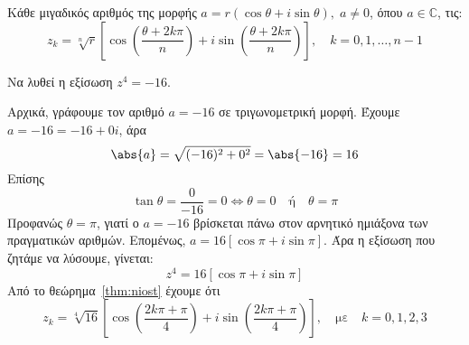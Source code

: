       \begin{thm}\label{thm:niost}
        Κάθε μιγαδικός αριθμός της μορφής $a=r(\cos\theta+i\sin\theta), \; a\neq 0$,
        όπου $ a \in \mathbb{C} $, τις: 
        \[
          \boxed{z_{k}=\sqrt[n]{r}\left[ \cos\left(\frac{\theta+2k\pi}{n}\right)+i
          \sin\left(\frac{\theta+2k\pi}{n}\right) \right], \quad k=0,1,\ldots, n-1}
        \]
      \end{thm}
      \begin{example}
        Να λυθεί η εξίσωση $ z^{4} = -16 $. 
      \end{example}
      \begin{solution}
        Αρχικά, γράφουμε τον αριθμό $ a = -16 $ σε τριγωνομετρική μορφή. Έχουμε 
        $ a=-16=-16+0i $, άρα 
        \[ 
          \abs{a} = \sqrt{(-16)^{2}+0^2} = \abs{-16} = 16 
        \] 
        Επίσης
        \[
          \tan{\theta} = \frac{0}{-16} = 0 \Leftrightarrow \theta =0 \quad
          \text{ή} \quad \theta = \pi
        \] 
        Προφανώς $ \theta = \pi $, γιατί ο $a=-16$ βρίσκεται πάνω στον αρνητικό 
        ημιάξονα των πραγματικών αριθμών. Επομένως, $ a = 16[\cos{\pi} + i
        \sin{\pi}] $. Άρα η εξίσωση που ζητάμε να λύσουμε, γίνεται:
        \[
          z^{4} = 16 [\cos{\pi} + i \sin{\pi}] 
        \] 
        Από το θεώρημα~\ref{thm:niost} έχουμε ότι
        \[
          z_{k} = \sqrt[4]{16} \left[\cos{\left(\frac{2k \pi + \pi}{4}\right)} + i
          \sin{\left(\frac{2k \pi + \pi}{ 4}\right)}\right], 
          \quad \text{με} \quad k=0,1,2,3
        \] 


      \end{solution}



      
